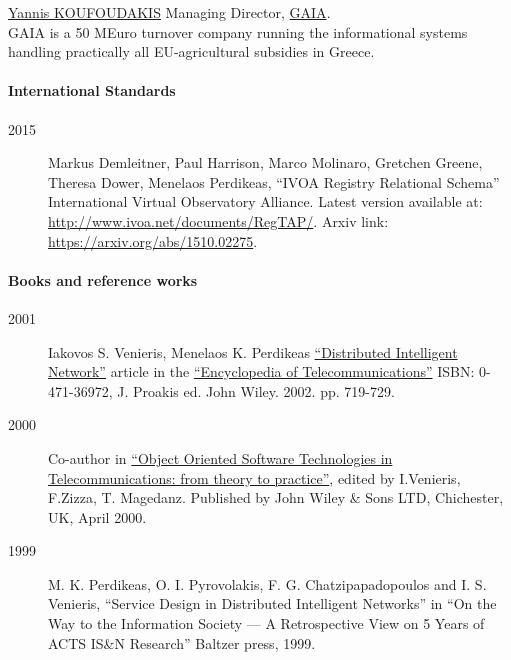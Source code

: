 \documentclass[10pt,a4paper]{article} %
\begin{document}
  \inlineheadsection
      {\href{mailto:i_koufoudakis@c-gaia.gr}{Yannis KOUFOUDAKIS}}
      {Managing Director, \href{https://www.c-gaia.gr/}{GAIA}.
        \\ GAIA is a 50 MEuro turnover company running the informational systems handling
        practically all EU-agricultural subsidies in Greece.}
\fi
\spacedhrule{1.6em}{-0.4em} %

\newpage



  \paragraph{International Standards}
  \begin{description}
  \item[2015] Markus Demleitner, Paul Harrison, Marco Molinaro, Gretchen Greene, Theresa Dower, Menelaos Perdikeas,
    ``IVOA Registry Relational Schema'' International Virtual Observatory Alliance. Latest version available at:
    \href{http://www.ivoa.net/documents/RegTAP/}{http://www.ivoa.net/documents/RegTAP/}. Arxiv link:
    \href{https://arxiv.org/abs/1510.02275}{https://arxiv.org/abs/1510.02275}.
  \end{description}

  \paragraph{Books and reference works}
  \begin{description}
  \item[2001] Iakovos S. Venieris, Menelaos K. Perdikeas
    \href{http://onlinelibrary.wiley.com/doi/10.1002/0471219282.eot257/full}{``Distributed Intelligent Network''} article in the
    \href{http://eu.wiley.com/WileyCDA/WileyTitle/productCd-0471369721.html}{``Encyclopedia of Telecommunications''} ISBN: 0-471-36972, J. Proakis ed. John Wiley. 2002. pp. 719-729.
  \item[2000] Co-author in \href{http://eu.wiley.com/WileyCDA/WileyTitle/productCd-0471623792.html}{``Object Oriented Software Technologies in Telecommunications: from theory to practice''}, edited by I.Venieris, F.Zizza, T. Magedanz. Published by John Wiley \& Sons LTD, Chichester, UK, April 2000.
  \item[1999] M. K. Perdikeas, O. I. Pyrovolakis, F. G. Chatzipapadopoulos and I. S. Venieris, ``Service Design in Distributed Intelligent Networks'' in ``On the Way to the Information Society --- A Retrospective View on 5 Years of ACTS IS\&N Research'' Baltzer press, 1999.
  \end{description}
\end{document}
